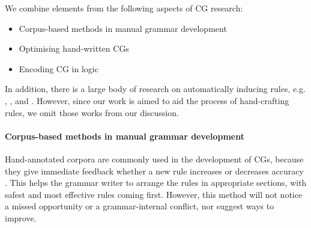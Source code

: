 We combine elements from the following aspects of CG research:

\begin{itemize}
\item Corpus-based methods in manual grammar development \cite{voutilainen2004}
\item Optimising hand-written CGs~\cite{bick2013tuning}
\item Encoding CG in logic \cite{lager98,lager_nivre01,listenmaa_claessen2015}
\end{itemize}

In addition, there is a large body of research on automatically
inducing rules, e.g. , ,
 and .
However, since our work is aimed to aid the process of hand-crafting rules, we omit those works from our discussion.


\paragraph{Corpus-based methods in manual grammar development}

Hand-annotated corpora are commonly used in the development of CGs, because they give immediate feedback whether a new rule increases or decreases accuracy \cite{voutilainen2004}.
This helps the grammar writer to arrange the rules in appropriate sections, with safest and most effective rules coming first.
However, this method will not notice a missed opportunity or a grammar-internal conflict, nor suggest ways to improve.




